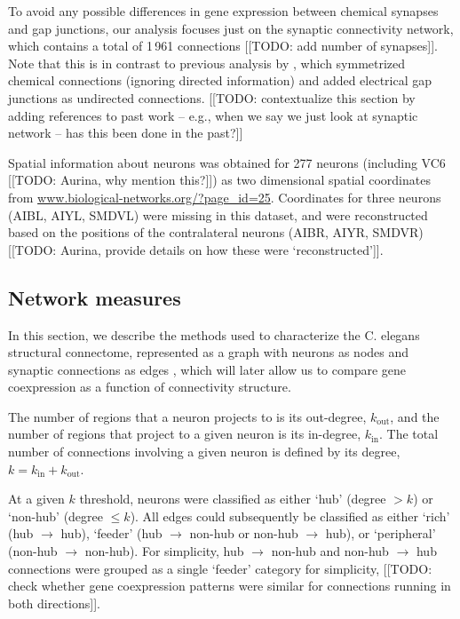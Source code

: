 \documentclass[10pt,letterpaper]{article}
\begin{document}
To avoid any possible differences in gene expression between chemical synapses and gap junctions, our analysis focuses just on the synaptic connectivity network, which contains a total of 1\,961 connections [[TODO: add number of synapses]].
Note that this is in contrast to previous analysis by \citet{Towlson:2013gf}, which symmetrized chemical connections (ignoring directed information) and added electrical gap junctions as undirected connections.
[[TODO: contextualize this section by adding references to past work -- e.g., when we say we just look at synaptic network -- has this been done in the past?]]

Spatial information about neurons was obtained for 277 neurons (including VC6 [[TODO: Aurina, why mention this?]]) as two dimensional spatial coordinates from \url{www.biological-networks.org/?page_id=25}.
Coordinates for three neurons (AIBL, AIYL, SMDVL) were missing in this dataset, and were reconstructed based on the positions of the contralateral neurons (AIBR, AIYR, SMDVR) [[TODO: Aurina, provide details on how these were `reconstructed']].

\subsection*{Network measures}

In this section, we describe the methods used to characterize the C. elegans structural connectome, represented as a graph with neurons as nodes and synaptic connections as edges \cite{Schroter:2017eo}, which will later allow us to compare gene coexpression as a function of connectivity structure.

The number of regions that a neuron projects to is its out-degree, $k_\mathrm{out}$, and the number of regions that project to a given neuron is its in-degree, $k_\mathrm{in}$.
The total number of connections involving a given neuron is defined by its degree, $k = k_\mathrm{in} + k_\mathrm{out}$.

At a given $k$ threshold, neurons were classified as either `hub' (degree $>k$) or `non-hub' (degree $\leq k$).
All edges could subsequently be classified as either `rich' (hub $\rightarrow$ hub), `feeder' (hub $\rightarrow$ non-hub or non-hub $\rightarrow$ hub), or `peripheral' (non-hub $\rightarrow$ non-hub).
For simplicity, hub $\rightarrow$ non-hub and non-hub $\rightarrow$ hub connections were grouped as a single `feeder' category for simplicity, [[TODO: check whether gene coexpression patterns were similar for connections running in both directions]].
\end{document}
